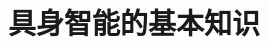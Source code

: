 \setcounter{chapter}{29}

\hypertarget{ux5177ux8eabux667aux80fdux7684ux57faux672cux77e5ux8bc6}{%
\chapter{具身智能的基本知识}\label{ux5177ux8eabux667aux80fdux7684ux57faux672cux77e5ux8bc6}}
